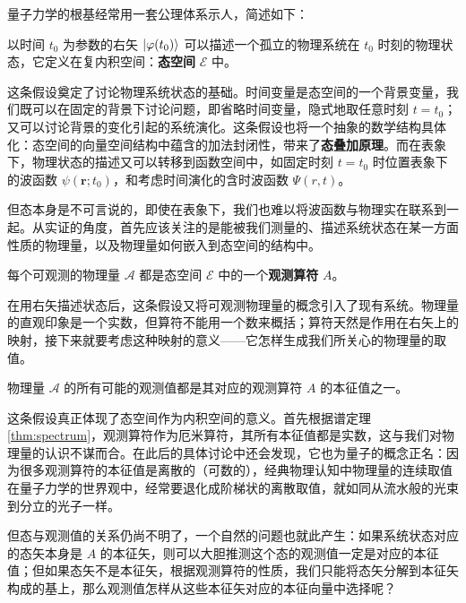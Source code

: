 \documentclass[cn,10pt,math=newtx,citestyle=gb7714-2015,bibstyle=gb7714-2015]{elegantbook}
\def\bm{\boldsymbol}
\def\bf{\textbf}
\def\ms{\mathscr}
\def\mc{\mathcal}
\begin{document}
量子力学的根基经常用一套公理体系示人，简述如下：

\begin{postulate}[态空间与右矢]\label{pos:state&ket}
   以时间 $t_0$ 为参数的右矢 $\ket{\varphi(t_0)}$ 可以描述一个孤立的物理系统在 $t_0$ 时刻的物理状态，它定义在复内积空间：\bf{态空间} $\ms E$ 中。
\end{postulate}

这条假设奠定了讨论物理系统状态的基础。时间变量是态空间的一个背景变量，我们既可以在固定的背景下讨论问题，即省略时间变量，隐式地取任意时刻 $t=t_0$；又可以讨论背景的变化引起的系统演化。这条假设也将一个抽象的数学结构具体化：态空间的向量空间结构中蕴含的加法封闭性，带来了\textbf{态叠加原理}。而在表象下，物理状态的描述又可以转移到函数空间中，如固定时刻 $t=t_0$ 时位置表象下的波函数 $\psi(\bm r;t_0)$，和考虑时间演化的含时波函数 $\Psi(r,t)$。

但态本身是不可言说的，即使在表象下，我们也难以将波函数与物理实在联系到一起。从实证的角度，首先应该关注的是能被我们测量的、描述系统状态在某一方面性质的物理量，以及物理量如何嵌入到态空间的结构中。

\begin{postulate}[物理量与算符]\label{pos:measurableop} 
   每个可观测的物理量 $\mc A$ 都是态空间 $\ms E$ 中的一个\bf{观测算符} $A$。
\end{postulate}

在用右矢描述状态后，这条假设又将可观测物理量的概念引入了现有系统。物理量的直观印象是一个实数，但算符不能用一个数来概括；算符天然是作用在右矢上的映射，接下来就要考虑这种映射的意义——它怎样生成我们所关心的物理量的取值。

\begin{postulate}[物理量的观测值]\label{pos:measurableval} 
   物理量 $\mc A$ 的所有可能的观测值都是其对应的观测算符 $A$ 的本征值之一。
   
\end{postulate}

这条假设真正体现了态空间作为内积空间的意义。首先根据谱定理 \ref{thm:spectrum}，观测算符作为厄米算符，其所有本征值都是实数，这与我们对物理量的认识不谋而合。在此后的具体讨论中还会发现，它也为量子的概念正名：因为很多观测算符的本征值是离散的（可数的），经典物理认知中物理量的连续取值在量子力学的世界观中，经常要退化成阶梯状的离散取值，就如同从流水般的光束到分立的光子一样。

但态与观测值的关系仍尚不明了，一个自然的问题也就此产生：如果系统状态对应的态矢本身是 $A$ 的本征矢，则可以大胆推测这个态的观测值一定是对应的本征值；但如果态矢不是本征矢，根据观测算符的性质，我们只能将态矢分解到本征矢构成的基上，那么观测值怎样从这些本征矢对应的本征向量中选择呢？
\end{document}
